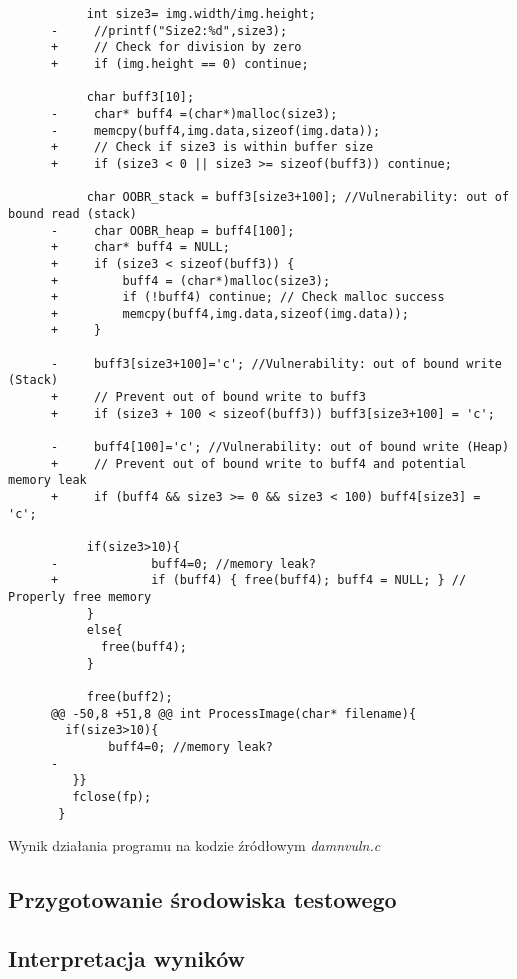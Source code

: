 \begin{listing}[H]
\begin{verbatim}
           int size3= img.width/img.height;
      -		//printf("Size2:%d",size3);
      +		// Check for division by zero
      +		if (img.height == 0) continue;
       
           char buff3[10];
      -		char* buff4 =(char*)malloc(size3);
      -		memcpy(buff4,img.data,sizeof(img.data));
      +		// Check if size3 is within buffer size
      +		if (size3 < 0 || size3 >= sizeof(buff3)) continue;
       
           char OOBR_stack = buff3[size3+100]; //Vulnerability: out of bound read (stack)
      -		char OOBR_heap = buff4[100];
      +		char* buff4 = NULL;
      +		if (size3 < sizeof(buff3)) {
      +			buff4 = (char*)malloc(size3);
      +			if (!buff4) continue; // Check malloc success
      +			memcpy(buff4,img.data,sizeof(img.data));
      +		}
       
      -		buff3[size3+100]='c'; //Vulnerability: out of bound write (Stack)
      +		// Prevent out of bound write to buff3
      +		if (size3 + 100 < sizeof(buff3)) buff3[size3+100] = 'c';
       
      -		buff4[100]='c'; //Vulnerability: out of bound write (Heap)
      +		// Prevent out of bound write to buff4 and potential memory leak
      +		if (buff4 && size3 >= 0 && size3 < 100) buff4[size3] = 'c';
       
           if(size3>10){
      -				buff4=0; //memory leak?
      +				if (buff4) { free(buff4); buff4 = NULL; } // Properly free memory
           }
           else{
             free(buff4);
           }
       
           free(buff2);
      @@ -50,8 +51,8 @@ int ProcessImage(char* filename){
        if(size3>10){
              buff4=0; //memory leak?
      -
         }}
         fclose(fp);
       }

    \end{verbatim}
    \caption{Wynik działania programu na kodzie źródłowym \textit{damnvuln.c}}
    \label{lst:code2}
\end{listing}


\subsection{Przygotowanie środowiska testowego}
\DOTSB

\subsection{Interpretacja wyników}
\label{subsec:interpretacja_wynikow}

